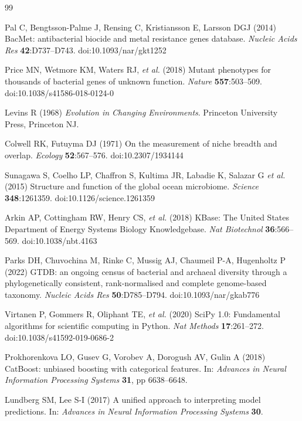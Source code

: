 \documentclass[11pt]{article}
\begin{document}
\clearpage
\begin{thebibliography}{99}

Pal C, Bengtsson-Palme J, Rensing C, Kristiansson E, Larsson DGJ (2014) BacMet:
antibacterial biocide and metal resistance genes database. \textit{Nucleic Acids
Res} \textbf{42}:D737--D743. doi:10.1093/nar/gkt1252

Price MN, Wetmore KM, Waters RJ, \textit{et al.} (2018) Mutant phenotypes for
thousands of bacterial genes of unknown function. \textit{Nature}
\textbf{557}:503--509. doi:10.1038/s41586-018-0124-0

Levins R (1968) \textit{Evolution in Changing Environments}. Princeton
University Press, Princeton NJ.

Colwell RK, Futuyma DJ (1971) On the measurement of niche breadth and overlap.
\textit{Ecology} \textbf{52}:567--576. doi:10.2307/1934144

Sunagawa S, Coelho LP, Chaffron S, Kultima JR, Labadie K, Salazar G
\textit{et al.} (2015) Structure and function of the global ocean microbiome.
\textit{Science} \textbf{348}:1261359. doi:10.1126/science.1261359

Arkin AP, Cottingham RW, Henry CS, \textit{et al.} (2018) KBase: The United
States Department of Energy Systems Biology Knowledgebase. \textit{Nat
Biotechnol} \textbf{36}:566--569. doi:10.1038/nbt.4163

Parks DH, Chuvochina M, Rinke C, Mussig AJ, Chaumeil P-A, Hugenholtz P
(2022) GTDB: an ongoing census of bacterial and archaeal diversity through
a phylogenetically consistent, rank-normalised and complete genome-based
taxonomy. \textit{Nucleic Acids Res} \textbf{50}:D785--D794.
doi:10.1093/nar/gkab776

Virtanen P, Gommers R, Oliphant TE, \textit{et al.} (2020) SciPy 1.0:
Fundamental algorithms for scientific computing in Python.
\textit{Nat Methods} \textbf{17}:261--272. doi:10.1038/s41592-019-0686-2

Prokhorenkova LO, Gusev G, Vorobev A, Dorogush AV, Gulin A (2018)
CatBoost: unbiased boosting with categorical features. In:
\textit{Advances in Neural Information Processing Systems} \textbf{31},
pp 6638--6648.

Lundberg SM, Lee S-I (2017) A unified approach to interpreting model
predictions. In: \textit{Advances in Neural Information Processing
Systems} \textbf{30}.


\end{thebibliography}
\end{document}
